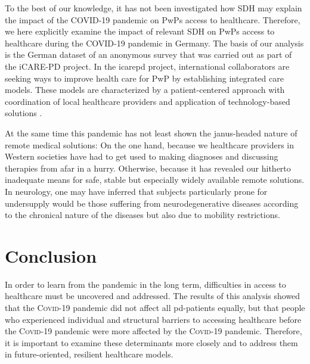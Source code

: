\documentclass{bmcart}
\begin{document}
To the best of our knowledge, it has not been investigated how SDH may explain the impact of the COVID-19 pandemic on PwPs access to healthcare. Therefore, we here explicitly examine the impact of relevant SDH on PwPs access to healthcare during the COVID-19 pandemic in Germany. The basis of our analysis is the German dataset of an anonymous survey that was carried out as part of the iCARE-PD project. In the \acs{icarepd} project, international collaborators are seeking ways to improve health care for PwP by establishing integrated care models. These models are characterized by a patient-centered approach with coordination of local healthcare providers and application of technology-based solutions \cite{fabbri2020moving}.  

At the same time this pandemic has not least shown the janus-headed nature of remote medical solutions: On the one hand, because we healthcare providers in Western societies have had to get used to making diagnoses and discussing therapies from afar in a hurry. Otherwise, because it has revealed our hitherto inadequate means for safe, stable but especially widely available remote solutions. In neurology, one may have inferred that subjects particularly prone for undersupply would be those suffering from neurodegenerative diseases according to the chronical nature of the diseases but also due to mobility restrictions. 

\fi

\section*{Conclusion}
In order to learn from the pandemic in the long term, difficulties in access to healthcare must be uncovered and addressed. The results of this analysis showed that the \textsc{Covid}-19 pandemic did not affect all \ac{pd}-patients equally, but that people who experienced individual and structural barriers to accessing healthcare before the \textsc{Covid}-19 pandemic were more affected by the \textsc{Covid}-19 pandemic. Therefore, it is important to examine these determinants more closely and to address them in future-oriented, resilient healthcare models.


\end{document}
